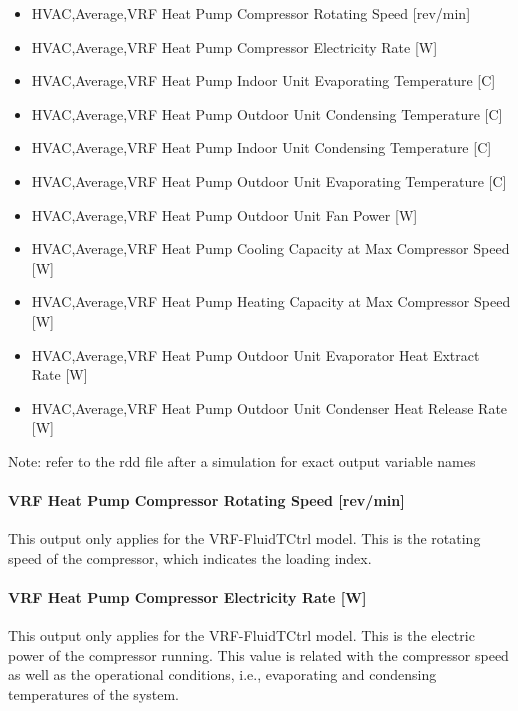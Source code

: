 \begin{itemize}
\item
  HVAC,Average,VRF Heat Pump Compressor Rotating Speed {[}rev/min{]}
\item
  HVAC,Average,VRF Heat Pump Compressor Electricity Rate {[}W{]}
\item
  HVAC,Average,VRF Heat Pump Indoor Unit Evaporating Temperature {[}C{]}
\item
  HVAC,Average,VRF Heat Pump Outdoor Unit Condensing Temperature {[}C{]}
\item
  HVAC,Average,VRF Heat Pump Indoor Unit Condensing Temperature {[}C{]}
\item
  HVAC,Average,VRF Heat Pump Outdoor Unit Evaporating Temperature {[}C{]}
\item
  HVAC,Average,VRF Heat Pump Outdoor Unit Fan Power {[}W{]}
\item
  HVAC,Average,VRF Heat Pump Cooling Capacity at Max Compressor Speed {[}W{]}
\item
  HVAC,Average,VRF Heat Pump Heating Capacity at Max Compressor Speed {[}W{]}
\item
  HVAC,Average,VRF Heat Pump Outdoor Unit Evaporator Heat Extract Rate {[}W{]}
\item
  HVAC,Average,VRF Heat Pump Outdoor Unit Condenser Heat Release Rate {[}W{]}
\end{itemize}

Note: refer to the rdd file after a simulation for exact output variable names

\paragraph{VRF Heat Pump Compressor Rotating Speed {[}rev/min{]}}\label{vrf-heat-pump-compressor-rotating-speed-revmin}

This output only applies for the VRF-FluidTCtrl model. This is the rotating speed of the compressor, which indicates the loading index.

\paragraph{VRF Heat Pump Compressor Electricity Rate {[}W{]}}\label{vrf-heat-pump-compressor-electric-power-at-cooling-mode-w}

This output only applies for the VRF-FluidTCtrl model. This is the electric power of the compressor running. This value is related with the compressor speed as well as the operational conditions, i.e., evaporating and condensing temperatures of the system.

